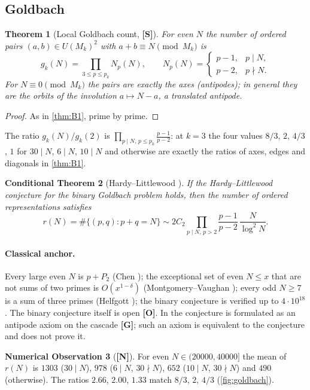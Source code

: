 \documentclass[11pt,a4paper]{article}
\newcommand{\statS}{\textsf{\textbf{[S]}}}
\newcommand{\statG}{\textsf{\textbf{[G]}}}
\newcommand{\statN}{\textsf{\textbf{[N]}}}
\newcommand{\statO}{\textsf{\textbf{[O]}}}
\theoremstyle{plain}
\newtheorem{theorem}{Theorem}[section]
\newtheorem{conditional}[theorem]{Conditional Theorem}
\theoremstyle{definition}
\newtheorem{observation}[theorem]{Numerical Observation}
\theoremstyle{remark}
\begin{document}
\subsection{Goldbach}
\begin{theorem}[Local Goldbach count, \statS]\label{thm:goldbach}
For even $N$ the number of ordered pairs $(a,b)\in U(M_k)^2$ with
$a+b\equiv N\pmod{M_k}$ is
\[
g_k(N)=\prod_{3\le p\le p_k}N_p(N),\qquad N_p(N)=\begin{cases}p-1,&p\mid N,\\p-2,&p\nmid N.\end{cases}
\]
For $N\equiv0\pmod{M_k}$ the pairs are exactly the axes (antipodes); in general
they are the orbits of the involution $a\mapsto N-a$, a translated antipode.
\end{theorem}
\begin{proof}
As in \cref{thm:B1}, prime by prime.
\end{proof}
The ratio $g_k(N)/g_k(2)$ is $\prod_{p\mid N,\,p\le p_k}\frac{p-1}{p-2}$: at
$k=3$ the four values $8/3$, $2$, $4/3$, $1$ for $30\mid N$, $6\mid N$,
$10\mid N$ and otherwise are exactly the ratios of axes, edges and diagonals
in \cref{thm:B1}.

\begin{conditional}[Hardy--Littlewood \cite{HL}]
If the Hardy--Littlewood conjecture for the binary Goldbach problem holds, then
the number of ordered representations satisfies
\[r(N)=\#\{(p,q):p+q=N\}\sim2C_2\prod_{p\mid N,\,p>2}\frac{p-1}{p-2}\,\frac N{\log^2N}.\]
\end{conditional}
\paragraph{Classical anchor.} Every large even $N$ is $p+P_2$ (Chen \cite{Chen});
the exceptional set of even $N\le x$ that are not sums of two primes is
$O(x^{1-\delta})$ (Montgomery--Vaughan \cite{MV}); every odd $N\ge7$ is a sum
of three primes (Helfgott \cite{Helfgott}); the binary conjecture is verified
up to $4\cdot10^{18}$ \cite{OeSilva}. The binary conjecture itself is open
\statO. In \cite{K-goldbach,K-goldbachJNT} the conjecture is formulated as an
antipode axiom on the cascade \statG; such an axiom is equivalent to the
conjecture and does not prove it.

\begin{observation}[\statN]
For even $N\in(20000,40000]$ the mean of $r(N)$ is $1303$ ($30\mid N$), $978$
($6\mid N$, $30\nmid N$), $652$ ($10\mid N$, $30\nmid N$) and $490$
(otherwise). The ratios $2.66$, $2.00$, $1.33$ match $8/3$, $2$, $4/3$
(\cref{fig:goldbach}).
\end{observation}
\end{document}
